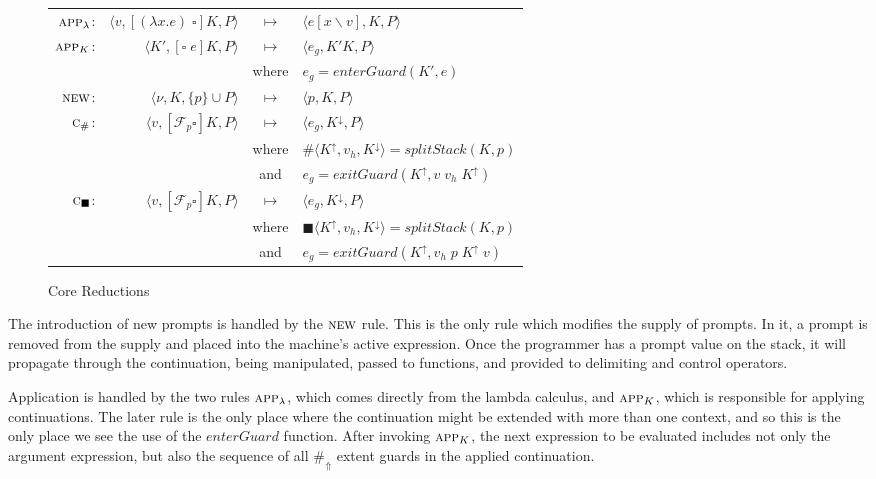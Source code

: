\documentclass[11pt]{article}
\newcommand\F{\mathcal{F}}
\newcommand{\angles}[1]{\langle#1\rangle}
\begin{document}
\begin{figure}[H]
\caption{Core Reductions}
\label{fig:interpreter-core}

\renewcommand{\arraystretch}{1.5}
\begin{tabular}{rrcl}
$\textsc{app}_\lambda$: &
	$\angles{v, [(\lambda x.e)\;\square]K,P}$ & $\longmapsto$ &
	$\angles{e[x\backslash v],K,P}$ \\
$\textsc{app}_K$: &
	$\angles{K', [\square\;e]K,P}$ & $\longmapsto$ &
	$\angles{e_g,K'K,P}$ \\
	&& where & $e_g = enterGuard(K',e)$ \\
$\textsc{new}$: &
	$\angles{\nu, K, \{p\} \cup P}$ & $\longmapsto$ &
	$\angles{p,K,P}$ \\
$\textsc{c}_\#$: &
	$\angles{v, [\F_p\square]K, P}$ & $\longmapsto$ &
	$\angles{e_g, K^\downarrow,P}$ \\
	&& where & $\#\angles{K^\uparrow, v_h, K^\downarrow} = splitStack(K,p)$ \\
	&& and & $e_g = exitGuard(K^\uparrow,v\;v_h\;K^\uparrow)$ \\
$\textsc{c}_\blacksquare$: &
	$\angles{v, [\F_p\square]K, P}$ & $\longmapsto$ &
	$\angles{e_g, K^\downarrow,P}$ \\
	&& where & $\blacksquare\angles{K^\uparrow, v_h, K^\downarrow} = splitStack(K,p)$ \\
	&& and & $e_g = exitGuard(K^\uparrow, v_h\;p\;K^\uparrow\;v)$ \\
\end{tabular}
\end{figure}



The introduction of new prompts is handled by the $\textsc{new}$ rule.
This is the only rule which modifies the supply of prompts.
In it, a prompt is removed from the supply and placed into the machine's active expression.
Once the programmer has a prompt value on the stack, it will propagate through the continuation, being manipulated, passed to functions, and provided to delimiting and control operators.

Application is handled by the two rules $\textsc{app}_\lambda$, which comes directly from the lambda calculus, and $\textsc{app}_K$, which is responsible for applying continuations.
The later rule is the only place where the continuation might be extended with more than one context, and so this is the only place we see the use of the $enterGuard$ function.
After invoking $\textsc{app}_K$, the next expression to be evaluated includes not only the argument expression, but also the sequence of all $\#_\Uparrow$ extent guards in the applied continuation.
\end{document}
